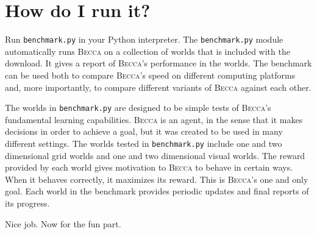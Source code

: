 \section{How do I run it?}

Run \texttt{benchmark.py} in your Python interpreter. The \texttt{benchmark.py} module automatically runs \textsc{Becca} on a collection of worlds that is included with the download. It gives a report of \textsc{Becca}'s performance in the worlds. The benchmark can be used both to compare \textsc{Becca}'s speed on different computing platforms and, more importantly, to compare different variants of \textsc{Becca} against each other.

The worlds in \texttt{benchmark.py} are designed to be simple tests of \textsc{Becca}'s fundamental learning capabilities. \textsc{Becca} is an agent, in the sense that it makes decisions in order to achieve a goal, but it was created to be used in many different settings. The worlds tested in \texttt{benchmark.py} include one and two dimensional grid worlds and one and two dimensional visual worlds. The reward provided by each world gives motivation to \textsc{Becca} to behave in certain ways. When it behaves correctly, it maximizes its reward. This is \textsc{Becca}'s one and only goal. Each world in the benchmark provides periodic updates and final reports of its progress. 

Nice job. Now for the fun part.